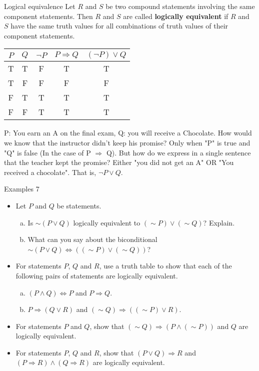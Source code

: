 \documentclass{beamer}
\begin{document}
\begin{frame}{Logical equivalence}
Let $R$ and $S$ be two compound statements involving the same component statements. Then $R$ and $S$ are called \textbf{logically equivalent} if $R$ and $S$ have the same truth values for all combinations of truth values of their component statements.\\
    
    \begin{center}
\begin{tabular}{|c|c|c|c|c|}
    \hline
    $P$ & $Q$ & $\neg P$ & $P \Rightarrow Q$ & $(\neg P) \lor Q$ \\
    \hline
    T & T & F & T & T \\
    T & F & F & F & F \\
    F & T & T & T & T \\
    F & F & T & T & T \\
    \hline
\end{tabular}
\end{center}

P: You earn an A on the final exam, Q: you will receive a Chocolate. How would we know that the instructor didn't keep his promise? Only when "P" is true and "Q" is false (In the case of P $\Rightarrow$ Q). But how do we express in a single sentence that the teacher kept the promise? Either "you did not get an A" OR "You received a chocolate". That is, $\neg P \lor Q$.

\end{frame}

\begin{frame}{Examples 7}
\begin{itemize}
    \item Let $P$ and $Q$ be statements.
    \begin{enumerate}[(a)]
        \item Is $\sim (P \lor Q)$ logically equivalent to $(\sim P) \lor (\sim Q)$? Explain.
        \item What can you say about the biconditional $\sim (P \lor Q) \Leftrightarrow ((\sim P) \lor (\sim Q))$?
    \end{enumerate}
    \item For statements $P$, $Q$ and $R$, use a truth table to show that each of the following pairs of statements are logically equivalent.
    \begin{enumerate}[(a)]
        \item $(P \land Q) \Leftrightarrow P$ and $P \Rightarrow Q$.
        \item $P \Rightarrow (Q \lor R)$ and $(\sim Q) \Rightarrow ((\sim P) \lor R)$.
    \end{enumerate}
    \item For statements $P$ and $Q$, show that $(\sim Q) \Rightarrow (P \land (\sim P))$ and $Q$ are logically equivalent.
    \item For statements $P$, $Q$ and $R$, show that $(P \lor Q) \Rightarrow R$ and $(P \Rightarrow R) \land (Q \Rightarrow R)$ are logically equivalent.
\end{itemize}
    
\end{frame}
\end{document}
